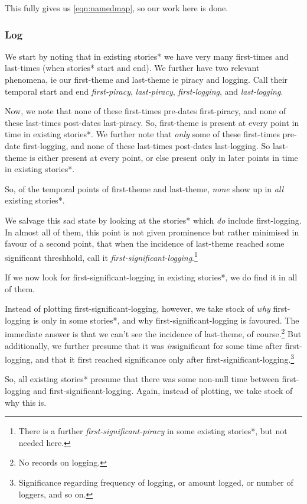 \documentclass{amsart}
\newcommand{\ment}{\textit} %
\theoremstyle{definition}
\theoremstyle{remark}
\begin{document}
			This fully gives us \ref{eqn:namedmap}, so our work here is done.
		\subsubsection{Log}
		\label{sss:log}
			We start by noting that in existing stories* we have very many first-times and last-times (when stories* start and end). We further have two relevant phenomena, ie our first-theme and last-theme ie piracy and logging. Call their temporal start and end \ment{first-piracy}, \ment{last-piracy}, \ment{first-logging}, and \ment{last-logging}.
			
			Now, we note that none of these first-times pre-dates first-piracy, and none of these last-times post-dates last-piracy. So, first-theme is present at every point in time in existing stories*. We further note that \emph{only} some of these first-times pre-date first-logging, and none of these last-times post-dates last-logging. So last-theme is either present at every point, or else present only in later points in time in existing stories*.
			
			So, of the temporal points of first-theme and last-theme, \emph{none} show up in \emph{all} existing stories*.
			
			We salvage this sad state by looking at the stories* which \emph{do} include first-logging. In almost all of them, this point is not given prominence but rather minimised in favour of a second point, that when the incidence of last-theme reached some significant threshhold, call it \ment{first-significant-logging}.\footnote{There is a further \ment{first-significant-piracy} in some existing stories*, but not needed here.}
			
			If we now look for first-significant-logging in existing stories*, we do find it in all of them.
			
			Instead of plotting first-significant-logging, however, we take stock of \emph{why} first-logging is only in some stories*, and why first-significant-logging is favoured. The immediate answer is that we can't see the incidence of last-theme, of course.\footnote{No records on logging.} But additionally, we further presume that it was \emph{in}significant for some time after first-logging, and that it first reached significance only after first-significant-logging.\footnote{Significance regarding frequency of logging, or amount logged, or number of loggers, and so on.}
			
			So, all existing stories* presume that there was some non-null time between first-logging and first-significant-logging. Again, instead of plotting, we take stock of why this is.
			
\end{document}
